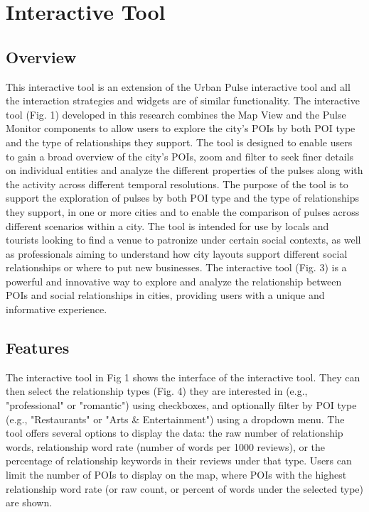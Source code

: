 \section{Interactive Tool}

\subsection{Overview}

This interactive tool is an extension of the Urban Pulse interactive tool\cite{b1} and all the interaction strategies and widgets are of similar functionality. The interactive tool (Fig. 1) developed in this research combines the Map View and the Pulse Monitor components to allow users to explore the city's POIs by both POI type and the type of relationships they support. The tool is designed to enable users to gain a broad overview of the city's POIs, zoom and filter to seek finer details on individual entities and analyze the different properties of the pulses along with the activity across different temporal resolutions. The purpose of the tool is to support the exploration of pulses by both POI type and the type of relationships they support, in one or more cities and to enable the comparison of pulses across different scenarios within a city. The tool is intended for use by locals and tourists looking to find a venue to patronize under certain social contexts, as well as professionals aiming to understand how city layouts support different social relationships or where to put new businesses. The interactive tool (Fig. 3) is a powerful and innovative way to explore and analyze the relationship between POIs and social relationships in cities, providing users with a unique and informative experience.

\subsection{Features}
The interactive tool in Fig 1 shows the interface of the interactive tool. They can then select the relationship types (Fig. 4) they are interested in (e.g., "professional" or "romantic") using checkboxes, and optionally filter by POI type (e.g., "Restaurants" or "Arts \& Entertainment") using a dropdown menu. The tool offers several options to display the data: the raw number of relationship words, relationship word rate (number of words per 1000 reviews), or the percentage of relationship keywords in their reviews under that type. Users can limit the number of POIs to display on the map, where POIs with the highest relationship word rate (or raw count, or percent of words under the selected type) are shown.

